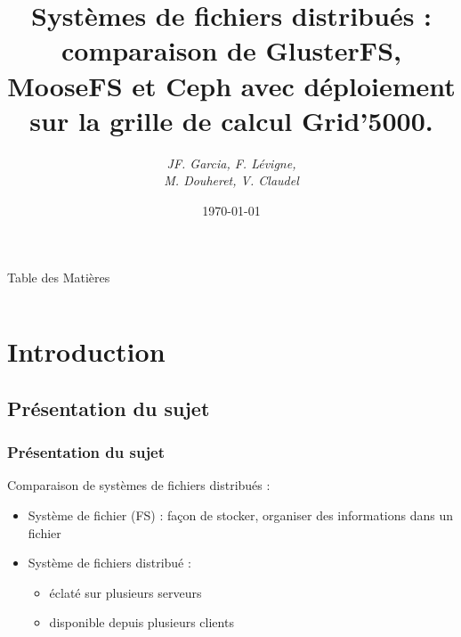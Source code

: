 \documentclass[blue]{beamer}
\title[Systèmes de fichiers distribués]{Systèmes de fichiers distribués : comparaison de GlusterFS, MooseFS et Ceph avec déploiement sur la grille de calcul Grid’5000.}
\author{\it JF. Garcia, F. Lévigne, \\M. Douheret, V. Claudel}
\date{\today}
\begin{document}
\titlepage
\begin{frame}{Table des Matières}
\begin{columns}[t]
\begin{column}{5cm}
\tableofcontents[sections={1-4}, hideothersubsections]
\end{column}
\begin{column}{5cm}
\tableofcontents[sections={5-8},hideothersubsections]
\end{column}
\end{columns}
\end{frame}
\section{Introduction}
	\subsection{Présentation du sujet}
	\begin{frame}
		\frametitle{Présentation du sujet}
		Comparaison de systèmes de fichiers distribués :
		\begin{itemize}
			\item Système de fichier (FS) : façon de stocker, organiser des informations dans un fichier
			\item Système de fichiers distribué :
			\begin{itemize}
				\item éclaté sur plusieurs serveurs %
				\item disponible depuis plusieurs clients
			\end{itemize}
		\end{itemize}
	\end{frame}
\end{document}
